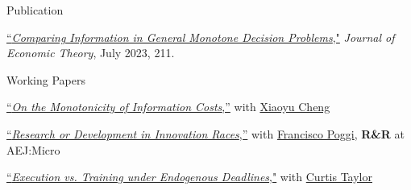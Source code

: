 \begin{rSection}{Publication}
	
	\begin{etaremune}
		\item \href{https://yonggyun-yg-kim.github.io/files/Research%20papers/GMDP_JET.pdf}{``\textit{Comparing Information in General Monotone Decision Problems},"} 
		\textit{Journal of Economic Theory}, July 2023, 211. 
		
	\end{etaremune}
	
	
	
\end{rSection}

\begin{rSection}{Working Papers}
	
	\begin{etaremune}
		
		\item
		 \href{https://yonggyun-yg-kim.github.io/files/Research%20papers/BMIC.pdf}{``\textit{On the Monotonicity of Information Costs},''} with \href{https://xiaoyu-cheng.com/}{Xiaoyu Cheng}
		
		\item \href{https://yonggyun-yg-kim.github.io/files/Research%20papers/RDIR.pdf}{``\textit{Research or Development in Innovation Races},''}   with \href{https://www.franciscopoggi.com/}{Francisco Poggi}, \textbf{R\&R} at AEJ:Micro
		
		\item \href{https://yonggyun-yg-kim.github.io/files/Research%20papers/Execution-v-Training.pdf}{``\textit{Execution vs. Training under Endogenous Deadlines},"} with \href{https://sites.google.com/view/curtistaylor/home}{Curtis Taylor}

	\end{etaremune}
	
	
\end{rSection}


